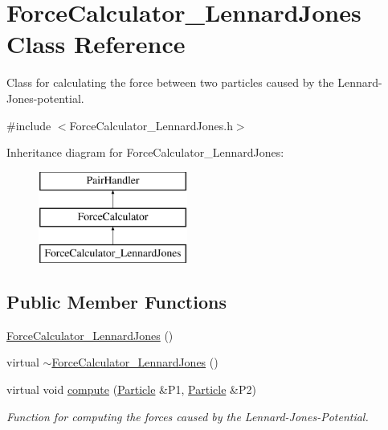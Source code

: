 \hypertarget{classForceCalculator__LennardJones}{\section{Force\-Calculator\-\_\-\-Lennard\-Jones Class Reference}
\label{classForceCalculator__LennardJones}
}


Class for calculating the force between two particles caused by the Lennard-\/\-Jones-\/potential.  




{\ttfamily \#include $<$Force\-Calculator\-\_\-\-Lennard\-Jones.\-h$>$}

Inheritance diagram for Force\-Calculator\-\_\-\-Lennard\-Jones\-:\begin{figure}[H]
\begin{center}
\leavevmode
\includegraphics[height=3.000000cm]{classForceCalculator__LennardJones}
\end{center}
\end{figure}
\subsection*{Public Member Functions}
\begin{DoxyCompactItemize}
\item 
\hyperlink{classForceCalculator__LennardJones_ad09d6a2c70144b8704038af3083cf88d}{Force\-Calculator\-\_\-\-Lennard\-Jones} ()
\item 
virtual \hyperlink{classForceCalculator__LennardJones_ae07cc5ce08ee49b8e848c75cbe5e874e}{$\sim$\-Force\-Calculator\-\_\-\-Lennard\-Jones} ()
\item 
virtual void \hyperlink{classForceCalculator__LennardJones_a153d67ac2a42b1e237c103e5f63b4461}{compute} (\hyperlink{classParticle}{Particle} \&P1, \hyperlink{classParticle}{Particle} \&P2)
\begin{DoxyCompactList}\small\item\em Function for computing the forces caused by the Lennard-\/\-Jones-\/\-Potential. \end{DoxyCompactList}\end{DoxyCompactItemize}


